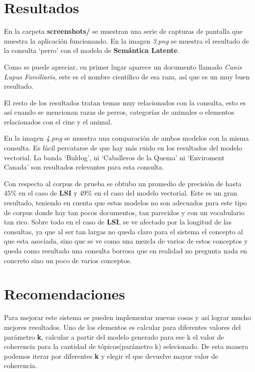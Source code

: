 \documentclass{llncs}
\begin{document}
\section{Resultados}

  En la carpeta \textbf{screenshots/} se muestran una serie de capturas de pantalla que muestra la aplicación funcionando. En la imagen \emph{3.png} se muestra el resultado de la consulta `perro' con el modelo de \textbf{Semántica Latente}. 

  Como se puede apreciar, en primer lugar aparece un documento llamado \emph{Canis Lupus Familiaris}, este es el nombre científico de esa raza, así que es un muy buen resultado. 

  El resto de los resultados tratan temas muy relacionados con la consulta, esto es así cuando se mencionan razas de perros, categorías de animales o elementos relacionados con el cine y el animal. 

  En la imagen \emph{4.png} se muestra una comparación de ambos modelos con la misma consulta. Es fácil percatarse de que hay más ruido en los resultados del modelo vectorial. La banda `Buldog', ni `Caballeros de la Quema' ni `Enviroment Canada' son resultados relevantes para esta consulta.

  Con respecto al corpus de prueba se obtubo un promedio de precisión de hasta $45\%$ en el caso de \textbf{LSI} y $49\%$ en el caso del modelo vectorial. Este es un gran resultado, teniendo en cuenta que estos modelos no son adecuados para este tipo de corpus donde hay tan pocos documentos, tan parecidos y con un vocabulario tan rico. Sobre todo en el caso de \textbf{LSI}, se ve afectado por la longitud de las consultas, ya que al ser tan largas no queda claro para el sistema el concepto al que esta asociada, sino que se ve como una mezcla de varios de estos conceptos y queda como resultado una consulta borrosa que en realidad no pregunta nada en concreto sino un poco de varios conceptos.
  
  
\section{Recomendaciones}
  Para mejorar este sistema se pueden implementar nuevas cosas y así lograr mucho mejores resultados. Uno de los elementos es calcular para diferentes valores del parámetro \textbf{k}, calcular a partir del modelo generado para ese k el valor de coherencia para la cantidad de tópicos(parámetro k) selecionado. De esta manera podemos iterar por diferentes \textbf{k} y elegir el que devuelve mayor valor de coherencia.
  
\end{document}
